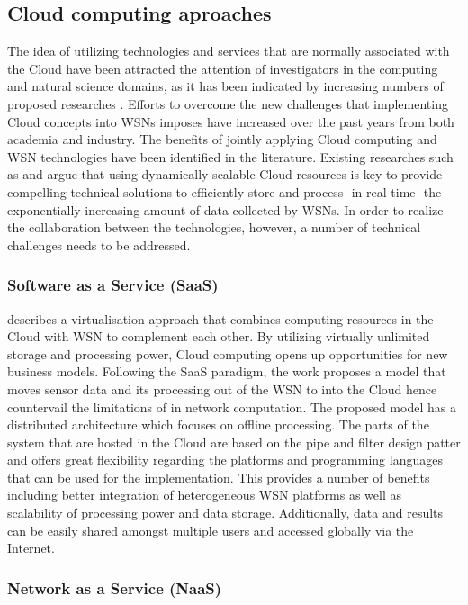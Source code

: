 \subsection{Cloud computing aproaches}
The idea of utilizing technologies and services that are normally associated with the Cloud have been attracted the attention of investigators in the computing and natural science domains, as it has been indicated by increasing numbers of proposed researches \cite{Kurschl:2009:CCC:1806338.1806435,ahmed2011integrating,rolim2010cloud} . Efforts to overcome the new challenges that implementing Cloud concepts into WSNs imposes have increased over the past years from both academia and industry. The benefits of jointly applying Cloud computing and WSN technologies have been identified in the literature. Existing researches such as \cite{liu2011opportunities} and \cite{hassan2009framework} argue that using dynamically scalable Cloud resources is key to provide compelling technical solutions to efficiently store and process -in real time- the exponentially increasing amount of data collected by WSNs. In order to realize the collaboration between the technologies, however, a number of technical challenges needs to be addressed.


\subsubsection{Software as a Service (SaaS)}
\cite{Kurschl:2009:CCC:1806338.1806435} describes a virtualisation approach that combines computing resources in the Cloud with WSN to complement each other. By utilizing virtually unlimited storage and processing power, Cloud computing opens up opportunities for new business models.  Following the SaaS paradigm, the work proposes a model that moves sensor data and its processing out of the WSN to into the Cloud hence countervail the limitations of in network computation. The proposed model has a distributed architecture which focuses on offline processing. The parts of the system that are hosted in the Cloud are based on the pipe and filter design patter and offers great flexibility regarding the platforms and programming languages that can be used for the implementation. This provides a number of benefits including
better integration of heterogeneous WSN platforms as well as scalability of processing power and data storage.  Additionally, data and results can be easily shared amongst multiple users and accessed globally via the Internet.

\subsubsection{Network as a Service (NaaS)}

